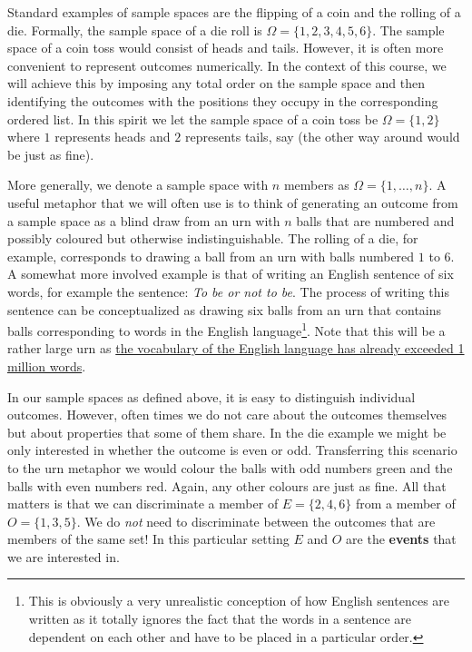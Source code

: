 Standard examples of sample spaces are the flipping of a coin and the rolling of a die. Formally,
the sample space of a die roll is $ \Omega = \{1,2,3,4,5,6\} $. The sample space of a coin toss
would consist of heads and tails. However, it is often more convenient to represent outcomes numerically.
In the context of this course, we will achieve this by imposing any total order on the sample space and then identifying the outcomes with the positions they occupy in the corresponding ordered list. In this spirit we let 
the sample space of a coin toss be $ \Omega = \{1,2\} $ where $ 1 $ represents heads and $ 2 $ represents
tails, say (the other way around would be just as fine). 

More generally, we denote a sample space with $ n $ members as $ \Omega = \{1,\ldots,n\} $. A useful 
metaphor that we will often use is to think of generating an outcome from a sample space as a blind draw from an urn with $ n $ balls 
that are numbered and possibly coloured but otherwise indistinguishable. The rolling of a die, for example,
corresponds to drawing a ball from an urn with balls numbered $ 1 $ to $ 6 $. A somewhat more involved 
example is that of writing an English sentence of six words, for example the sentence: 
\textit{To be or not to be}. The process of writing this sentence can be conceptualized as drawing 
six balls from an urn that contains balls corresponding to words
in the English language\footnote{This is obviously a very unrealistic conception of how English
sentences are written as it totally ignores the fact that the words in a sentence are dependent on each
other and have to be placed in a particular order.}. Note that this will be a rather large urn as 
\href{http://www.languagemonitor.com/number-of-words/number-of-words-in-the-english-language-1008879}
{the vocabulary of the English language has already exceeded 1 million words}.

In our sample spaces as defined above, it is easy to distinguish individual outcomes. However, often times
we do not care about the outcomes themselves but about properties that some of them share. In the
die example we might be only interested in whether the outcome is even or odd. Transferring this scenario to the urn metaphor we would colour the balls with odd numbers green and the balls
with even numbers red. Again, any other colours are just as fine. All that matters is that 
we can discriminate a member of $ E = \{2,4,6\} $ from a member of $ O = \{1,3,5\} $. We do \textit{not}
need to discriminate between the outcomes that are members of the same set! In this particular setting
$ E $ and $ O $ are the \textbf{events} that we are interested in.

